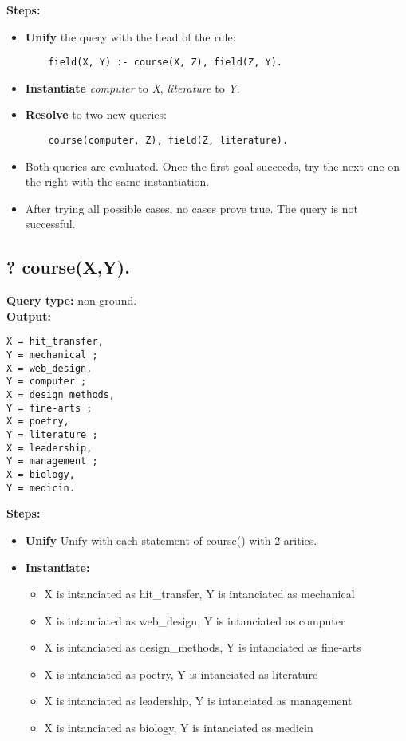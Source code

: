 \textbf{Steps:}
\begin{itemize}
    \item \textbf{Unify} the query with the head of the rule:
    \begin{lstlisting}
    field(X, Y) :- course(X, Z), field(Z, Y).
    \end{lstlisting}
\item \textbf{Instantiate} \textit{computer} to \textit{X}, \textit{literature} to \textit{Y}.
    \item \textbf{Resolve} to two new queries:
    \begin{lstlisting}
    course(computer, Z), field(Z, literature).
    \end{lstlisting}
\item Both queries are evaluated. Once the first goal succeeds, try the next one on the right with the same instantiation.
\item After trying all possible cases, no cases prove true. The query is not successful.
\end{itemize}

\subsection{? course(X,Y).}
\textbf{Query type: } non-ground. \\
\textbf{Output:}
\begin{lstlisting}
X = hit_transfer, 
Y = mechanical ; 
X = web_design, 
Y = computer ; 
X = design_methods, 
Y = fine-arts ; 
X = poetry, 
Y = literature ; 
X = leadership, 
Y = management ; 
X = biology, 
Y = medicin. 
\end{lstlisting}

\textbf{Steps:}
\begin{itemize}
    \item \textbf{Unify} Unify with each statement of course() with 2 arities.
    \item \textbf{Instantiate: } 
    \begin{itemize}
        \item X is intanciated as hit\_transfer, Y is intanciated as mechanical
        \item X is intanciated as web\_design, Y is intanciated as computer
        \item X is intanciated as design\_methods, Y is intanciated as fine-arts
        \item X is intanciated as poetry, Y is intanciated as literature
        \item X is intanciated as leadership, Y is intanciated as management
        \item X is intanciated as biology, Y is intanciated as medicin
    \end{itemize}
\end{itemize}

